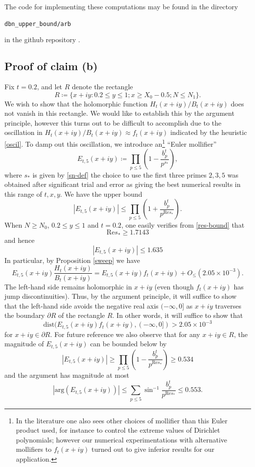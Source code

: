 The code for implementing these computations may be found in the directory

\centerline{\tt dbn\_upper\_bound/arb}

in the github repository \cite{github}.

\subsection{Proof of claim (b)}\label{b-bound}

Fix $t=0.2$, and let $R$ denote the rectangle
$$ R \coloneqq \{ x+iy: 0.2 \leq y \leq 1; x \geq X_0 - 0.5; N \leq N_1 \}.$$
We wish to show that the holomorphic function $H_t(x+iy)/B_t(x+iy)$ does not vanish in this rectangle.  We would like to establish this by the argument principle, however this turns out to be difficult to accomplish due to the oscillation in $H_t(x+iy)/B_t(x+iy) \approx f_t(x+iy)$ indicated by the heuristic \eqref{oscil}.  To damp out this oscillation, we introduce an\footnote{In the literature one also sees other choices of mollifier than this Euler product used, for instance to control the extreme values of Dirichlet polynomials; however our numerical experimentations with alternative mollifiers to $f_t(x+iy)$ turned out to give inferior results for our application.} ``Euler mollifier''
$$ E_{t,5}(x+iy) \coloneqq \prod_{p \leq 5} \left( 1 - \frac{b_p^t}{p^{s_*}}\right),$$
where $s_*$ is given by \eqref{sn-def} the choice to use the first three primes $2,3,5$ was obtained after significant trial and error as giving the best numerical results in this range of $t,x,y$.  We have the upper bound
$$
|E_{t,5}(x+iy)| \leq \prod_{p \leq 5} \left(1 + \frac{b_p^t}{p^{\mathrm{Re} s_*}} \right).
$$
When $N \geq N_0$, $0.2 \leq y \leq 1$ and $t = 0.2$, one easily verifies from \eqref{res-bound} that
$$ \mathrm{Re} s_* \geq 1.7143 $$
and hence
$$ |E_{t,5}(x+iy)| \leq 1.635 $$ %
In particular, by Proposition \ref{sweep} we have
$$ E_{t,5}(x+iy) \frac{H_t(x+iy)}{B_t(x+iy)} = E_{t,5}(x+iy) f_t(x+iy) + O_{\leq}( 2.05 \times 10^{-3} ).$$  %
The left-hand side remains holomorphic in $x+iy$ (even though $f_t(x+iy)$ has jump discontinuities).  Thus, by the argument principle, it will suffice to show that the left-hand side avoids the negative real axis $(-\infty,0]$ as $x+iy$ traverses the boundary $\partial R$ of the rectangle $R$.  In other words, it will suffice to show that
\begin{equation}\label{star}
 \mathrm{dist}( E_{t,5}(x+iy) f_t(x+iy), (-\infty,0]) > 2.05 \times 10^{-3}
\end{equation}
for $x+iy \in\partial R$.
For future reference we also observe that for any $x+iy \in R$,
the magnitude of $E_{t,5}(x+iy)$ can be bounded below by
\begin{equation}\label{et5-lower}
 |E_{t,5}(x+iy)| \geq \prod_{p \leq 5} \left(1 - \frac{b_p^t}{p^{\mathrm{Re} s_*}} \right) \geq 0.534 
\end{equation} %
and the argument has magnitude at most
\begin{equation}\label{et5-phase}
|\mathrm{arg}(E_{t,5}(x+iy))| \leq \sum_{p \leq 5} \sin^{-1} \frac{b_p^t}{p^{\mathrm{Re} s_*}} \leq 0.553. 
\end{equation} %

